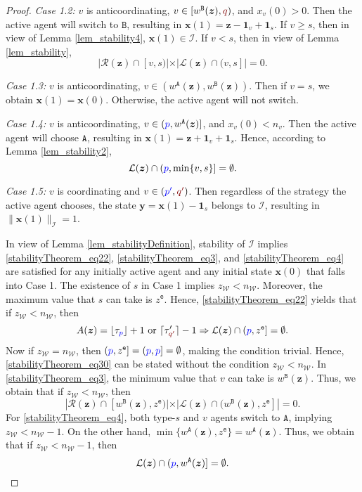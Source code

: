 \documentclass[10 pt,twocolumn,journal]{IEEEtran}
\DeclarePairedDelimiter{\ceil}{\lceil}{\rceil}
\DeclarePairedDelimiter{\floor}{\lfloor}{\rfloor}
\theoremstyle{plain}
\newcommand{\A}{\mathcal{A}}
\newcommand{\I}{\mathcal{I}}
\newcommand{\W}{\mathcal{W}}
\newcommand{\R}{\mathcal{R}}
\renewcommand{\L}{\mathcal{L}}
\newcommand{\x}{\bm{x}}
\newcommand{\y}{\bm{y}}
\newcommand{\z}{\bm{z}}
\newcommand{\p}{\tb{p}}
\newcommand{\pp}{\tb{p'}}
\newcommand{\q}{\tr{q}}
\newcommand{\qq}{\tr{q'}}
\newcommand{\e}{\mathtt{e}}
\renewcommand{\A}{\mathtt{A}}
\newcommand{\B}{\mathtt{B}}
\newcommand{\tb}{\textcolor{blue}}
\newcommand{\tr}{\textcolor{Myred}}
\theoremstyle{definition}
\begin{document}
\begin{proof}
\emph{Case 1.2:}   $v$ is anticoordinating,  $v\in[w^{\B}(\z),\q)$, and $x_v(0)>0$. 
Then the active agent will switch to $\B$, resulting in $\x(1) = \z - \bm{1}_v + \bm{1}_s$.
If $v \geq s$, then in view of Lemma \ref{lem_stability4}, $\x(1)\in\I$.
If $v<s$, then in view of Lemma \ref{lem_stability},
\begin{equation} \label{stabilityTheorem_eq3}
     |\R(\z)\cap[v,s)| \times |\L(\z)\cap(v,s]| = 0.
\end{equation}

\emph{Case 1.3:}   $v$ is anticoordinating,  $v\in(w^{\A}(\z),w^{\B}(\z))$.
Then if $v=s$, we obtain $\x(1)=\x(0)$.
Otherwise, the active agent will not switch.

\emph{Case 1.4:}  $v$ is anticoordinating,
$v\in(\p,w^{\A}(\z)]$, and $x_v(0) <n_v$. 
Then the active agent will choose $\A$, resulting in $\x(1) = \z + \bm{1}_v + \bm{1}_s$.
Hence, according to Lemma \ref{lem_stability2},
\begin{equation}    \label{stabilityTheorem_eq4}
    \L(\z)\cap(\p,\min\{v,s\}] = \emptyset.
\end{equation}

\emph{Case 1.5:} $v$ is coordinating and $v \in(\pp,\qq)$.
Then regardless of the strategy the active agent chooses, the state $\y=\x(1)-\bm{1}_s$ belongs to $\I$, resulting in $\|\x(1)\|_{\I} =1$.

In view of Lemma \ref{lem_stabilityDefinition}, stability of $\I$ implies \eqref{stabilityTheorem_eq22}, \eqref{stabilityTheorem_eq3}, and \eqref{stabilityTheorem_eq4} are satisfied for any initially active agent and any initial state $\x(0)$ that falls into Case 1.
The existence of $s$ in Case 1 implies $z_\W<n_\W$.
Moreover, the maximum value that $s$ can take is $z^{\e}$.
Hence, \eqref{stabilityTheorem_eq22} yields that if $z_\W<n_\W$, then
\begin{equation} \label{stabilityTheorem_eq30}
    A(\z)=\floor{\tau_{\p}}+1 \text{ or }\ceil{\tau'_{\qq}}-1
    \Rightarrow
    \L(\z)\cap(\p,z^{\e}] = \emptyset.
\end{equation} 
Now if $z_\W=n_\W$, then $(\p,z^{\e}] = (\p,\p] = \emptyset$, making the condition trivial. 
Hence, \eqref{stabilityTheorem_eq30} can be stated without the condition $z_\W<n_\W$.
In \eqref{stabilityTheorem_eq3}, the minimum value that $v$ can take is $w^{\B}(\z)$.
Thus, we obtain that if $z_\W<n_\W$, then 
\begin{equation}   \label{stabilityTheorem_eq31}
         |\R(\z)\cap[w^{\B}(\z),z^{\e})| \times |\L(\z)\cap(w^{\B}(\z),z^{\e}]| = 0.
\end{equation}
For \eqref{stabilityTheorem_eq4}, both type-$s$ and $v$ agents switch to $\A$, implying $z_\W<n_\W-1$.
On the other hand, $\min\{w^{\A}(\z),z^{\e}\}=w^{\A}(\z)$.
Thus, we obtain that if $z_\W<n_\W-1$, then
\begin{equation}    \label{stabilityTheorem_eq32}
    \L(\z)\cap(\p,w^{\A}(\z)] = \emptyset.
\end{equation}


\end{proof}
\end{document}
